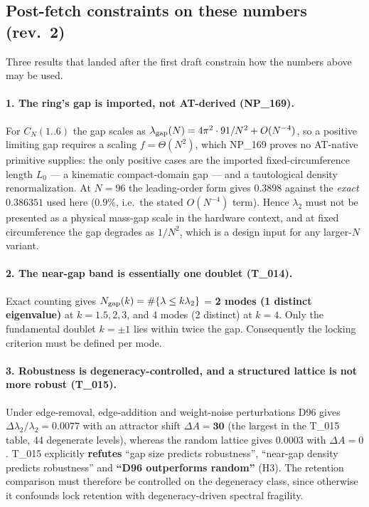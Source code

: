 \documentclass[11pt,a4paper]{article}
\newcommand{\ls}[1]{\ensuremath{\lambda_{#1}}}
\begin{document}
\subsection{Post-fetch constraints on these numbers (rev.\ 2)}
Three results that landed after the first draft constrain how the numbers above may be used.

\paragraph{1. The ring's gap is imported, not AT-derived (NP\_169).} For $C_N(1..6)$ the gap scales
as $\lambda_{\rm gap}(N)=4\pi^2\cdot 91/N^2+O(N^{-4})$, so a positive limiting gap requires a
scaling $f=\Theta(N^2)$, which NP\_169 proves no AT-native primitive supplies: the only positive
cases are the imported fixed-circumference length $L_0$ --- a kinematic compact-domain gap --- and a
tautological density renormalization. At $N=96$ the leading-order form gives $0.3898$ against the
\emph{exact} $0.386351$ used here ($0.9\%$, i.e.\ the stated $O(N^{-4})$ term). Hence $\ls{2}$ must
not be presented as a physical mass-gap scale in the hardware context, and at fixed circumference
the gap degrades as $1/N^2$, which is a design input for any larger-$N$ variant.

\paragraph{2. The near-gap band is essentially one doublet (T\_014).} Exact counting gives
$N_{\rm gap}(k)=\#\{\lambda\le k\ls{2}\}$ = \textbf{2 modes (1 distinct eigenvalue)} at
$k=1.5,2,3$, and 4 modes (2 distinct) at $k=4$. Only the fundamental doublet $k=\pm1$ lies within
twice the gap. Consequently the locking criterion must be defined per mode.

\paragraph{3. Robustness is degeneracy-controlled, and a structured lattice is not more robust
(T\_015).} Under edge-removal, edge-addition and weight-noise perturbations D96 gives
$\Delta\ls{2}/\ls{2}=0.0077$ with an attractor shift $\Delta A=\textbf{30}$ (the largest in the
T\_015 table, 44 degenerate levels), whereas the random lattice gives $0.0003$ with $\Delta A=0$.
T\_015 explicitly \textbf{refutes} ``gap size predicts robustness'', ``near-gap density predicts
robustness'' and \textbf{``D96 outperforms random''} (H3). The retention comparison must therefore
be controlled on the degeneracy class, since otherwise it confounds lock retention with
degeneracy-driven spectral fragility.
\end{document}
